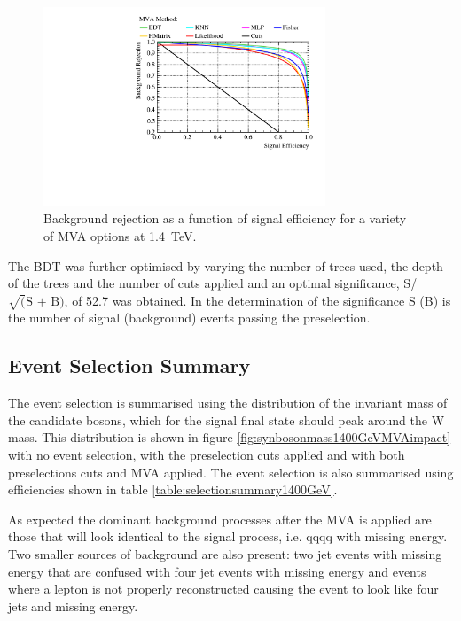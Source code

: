 \begin{figure}
\centering
\includegraphics[width=0.75\textwidth]{PhysicsAnalysis/Plots/MVAPlots/1400GeV/ThesisPlotMVAAlternatives1400GeV.pdf}
\caption[Background rejection as a function of signal efficiency for a variety of MVA options at 1.4~TeV.]{Background rejection as a function of signal efficiency for a variety of MVA options at 1.4~TeV.} 
\label{fig:mvaalternatives1400GeV}
\end{figure}

The BDT was further optimised by varying the number of trees used, the depth of the trees and the number of cuts applied and an optimal significance, S/$\sqrt(\text{S + B})$, of 52.7 was obtained.  In the determination of the significance S (B) is the number of signal (background) events passing the preselection.


\subsection{Event Selection Summary}
\label{sec:eventselsummary1400GeV}
The event selection is summarised using the distribution of the invariant mass of the candidate bosons, which for the signal final state should peak around the W mass.  This distribution is shown in figure \ref{fig:synbosonmass1400GeVMVAimpact} with no event selection, with the preselection cuts applied and with both preselections cuts and MVA applied.  The event selection is also summarised using efficiencies shown in table \ref{table:selectionsummary1400GeV}.

As expected the dominant background processes after the MVA is applied are those that will look identical to the signal process, i.e. qqqq with missing energy.  Two smaller sources of background are also present: two jet events with missing energy that are confused with four jet events with missing energy and events where a lepton is not properly reconstructed causing the event to look like four jets and missing energy.  

